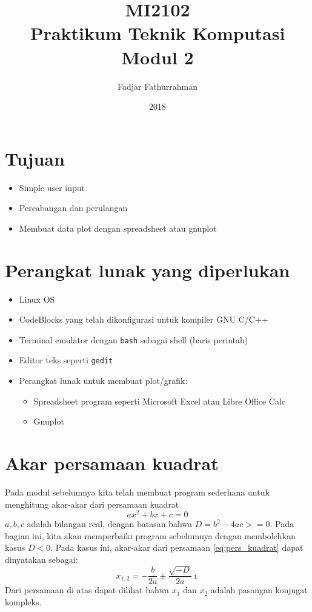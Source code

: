 \documentclass[a4paper,11pt]{extarticle}
\title{
MI2102\\
Praktikum Teknik Komputasi\\
Modul 2}
\author{Fadjar Fathurrahman}
\date{2018}
\begin{document}
\maketitle

\section{Tujuan}
\begin{itemize}
\item Simple user input
\item Percabangan dan perulangan
\item Membuat data plot dengan spreadsheet atau gnuplot
\end{itemize}

\section{Perangkat lunak yang diperlukan}
\begin{itemize}
\item Linux OS
\item CodeBlocks yang telah dikonfigurasi untuk kompiler GNU C/C++
\item Terminal emulator dengan \texttt{bash} sebagai shell (baris perintah)
\item Editor teks seperti \texttt{gedit}
\item Perangkat lunak untuk membuat plot/grafik:
\begin{itemize}
\item Spreadsheet program seperti \textsf{Microsoft Excel} atau \textsf{Libre Office Calc}
\item \textsf{Gnuplot}
\end{itemize}
\end{itemize}

\section{Akar persamaan kuadrat}
Pada modul sebelumnya kita telah membuat program sederhana untuk menghitung
akar-akar dari persamaan kuadrat
\begin{equation}
ax^2 + bx + c = 0
\label{eq:pers_kuadrat}
\end{equation}
$a, b, c$ adalah bilangan real, dengan batasan bahwa $D = b^2 - 4ac >= 0$.
Pada bagian ini, kita akan memperbaiki program sebelumnya dengan
membolehkan kasus $D < 0$. Pada kasus ini, akar-akar dari persamaan
\ref{eq:pers_kuadrat} dapat dinyatakan sebagai:
\begin{equation}
x_{1,2} = -\frac{b}{2a} \pm \frac{\sqrt{-D}}{2a}\imath
\end{equation}
Dari persamaan di atas dapat dilihat bahwa $x_{1}$ dan $x_{2}$ adalah
pasangan konjugat kompleks.
\end{document}
